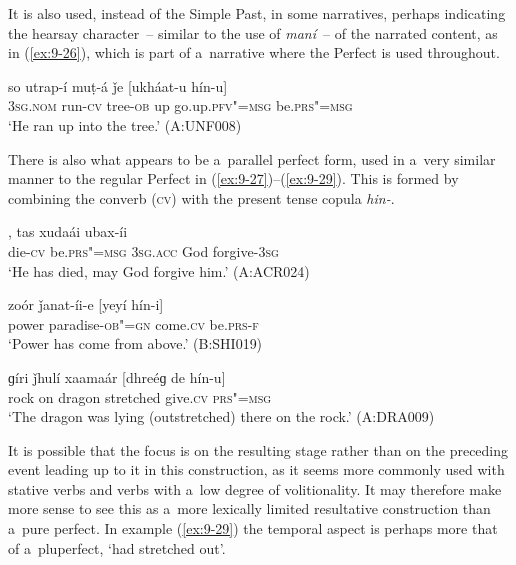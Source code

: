 It is also used, instead of the Simple Past, in some narratives, perhaps indicating the hearsay character~-- similar to the use of \textit{maní}~-- of the narrated content, as in (\ref{ex:9-26}), which is part of a~narrative where the Perfect is used throughout.

\begin{exe}
\ex
\label{ex:9-26}
\gll so utrap-í muṭ-á ǰe [ukháat-u hín-u] \\
\textsc{3sg.nom} run-\textsc{cv} tree-\textsc{ob} up go.up.\textsc{pfv"=msg} be.\textsc{prs"=msg} \\
\glt `He ran up into the tree.' (A:UNF008) 
\end{exe}

There is also what appears to be a~parallel perfect form, used in a~very similar manner to the regular Perfect in (\ref{ex:9-27})--(\ref{ex:9-29}). This is formed by combining the converb (\textsc{cv}) with the present tense copula \textit{hin-}.

\begin{exe}
\ex
\label{ex:9-27}
, tas xudaái ubax-íi \\
die-\textsc{cv} be.\textsc{prs"=msg} \textsc{3sg.acc} God forgive-\textsc{3sg} \\
\glt `He has died, may God forgive him.' (A:ACR024)

\ex
\label{ex:9-28}
\gll zoór ǰanat-íi-e [yeyí hín-i] \\
power paradise-\textsc{ob"=gn} come.\textsc{cv} be.\textsc{prs-f} \\
\glt `Power has come from above.' (B:SHI019)

\ex
\label{ex:9-29}
\gll ɡíri ǰhulí xaamaár [dhreéɡ de hín-u] \\
rock on dragon stretched give.\textsc{cv} \textsc{prs"=msg} \\
\glt `The dragon was lying (outstretched) there on the rock.' (A:DRA009)
\end{exe}

It is possible that the focus is on the resulting stage rather than on the preceding event leading up to it in this construction, as it seems more commonly used with stative verbs and verbs with a~low degree of volitionality. It may therefore make more sense to see this as a~more lexically limited resultative construction \citep[135]{dahl1985} than a~pure perfect. In example (\ref{ex:9-29}) the temporal aspect is perhaps more that of a~pluperfect, `had stretched out'. 



